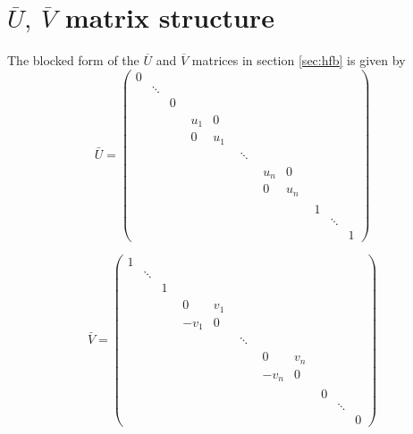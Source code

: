 \section{$\overline U,\ \overline V$ matrix structure}
\label{app:uv}
The blocked form of the $\overline U$ and $\overline V$ matrices in section \ref{sec:hfb} is given by
\[
\bar{U} =
\begin{pmatrix}
0 &        &        &        &        & & & & \\
 &\ddots        &        &       &        & & \\
 &        &0        &        &        & & \\
& &  & \begin{matrix} u_1 & 0 \\ 0 & u_1 \end{matrix} &        &        &        & & \\
& &  &        & \ddots &        &        & & \\
& &  &        &        & \begin{matrix} u_n & 0 \\ 0 & u_n \end{matrix} &        & & \\
& & & & &        & 1       &        & \\
& & & &  &        &        &   \ddots     & \\
& & & &  &        &        &        & 1
\end{pmatrix}
\]

\[
\bar{V} =
\begin{pmatrix}
1 &        &        &        &        & & & & \\
 &\ddots        &        &       &        & & \\
 &        &1        &        &        & & \\
& &  & \begin{matrix} 0 & v_1 \\ -v_1 & 0 \end{matrix} &        &        &        & & \\
& &  &        & \ddots &        &        & & \\
& &  &        &        & \begin{matrix} 0 & v_n \\ -v_n & 0 \end{matrix} &        & & \\
& & & & &        &0       &        & \\
& & & &  &        &        &   \ddots     & \\
& & & &  &        &        &        & 0
\end{pmatrix}
\]